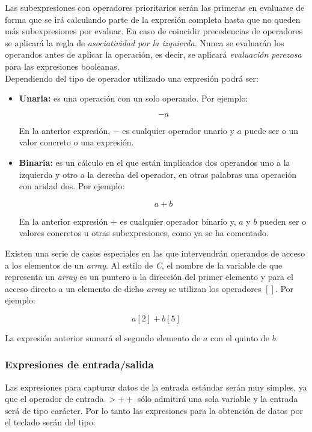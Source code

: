 \documentclass[a4paper,10pt]{article}
\begin{document}
Las subexpresiones con operadores prioritarios serán las primeras en evaluarse de forma que se irá calculando parte de la expresión completa hasta que no queden más subexpresiones por evaluar. En caso de coincidir precedencias de operadores se aplicará la regla de \emph{asociatividad por la izquierda}. Nunca se evaluarán los operandos antes de aplicar la operación, es decir, se aplicará \emph{evaluación perezosa} para las expresiones booleanas.
\\
Dependiendo del tipo de operador utilizado una expresión podrá ser:
\begin{itemize}
\item {\bf Unaria:} es una operación con un solo operando. Por ejemplo:

$$-a$$

En la anterior expresión, $-$ es cualquier operador unario y $a$ puede ser o un valor concreto o una expresión.
\item {\bf Binaria:} es un cálculo en el que están implicados dos operandos uno a la izquierda y otro a la derecha del operador, en otras palabras una operación con aridad dos. Por ejemplo:

$$a + b$$ 

En la anterior expresión $+$ es cualquier operador binario y, $a$ y $b$ pueden ser o valores concretos u otras subexpresiones, como ya se ha comentado.
\end{itemize}

Existen una serie de casos especiales en las que intervendrán operandos de acceso a los elementos de un \textit{array}. Al estilo de \emph{C}, el nombre de la variable de que representa un \textit{array} es un puntero a la dirección del primer elemento y para el acceso directo a un elemento de dicho \textit{array} se utilizan los operadores $[ ]$. Por ejemplo:

$$a[2] + b[5]$$ 

La expresión anterior sumará el segundo elemento de $a$ con el quinto de $b$.\\


\subsubsection*{Expresiones de entrada/salida}
Las expresiones para capturar datos de la entrada estándar serán muy simples, ya que el operador de entrada $>++$ sólo admitirá una sola variable y la entrada será de tipo carácter. Por lo tanto las expresiones para la obtención de datos por el teclado serán del tipo:
\end{document}
